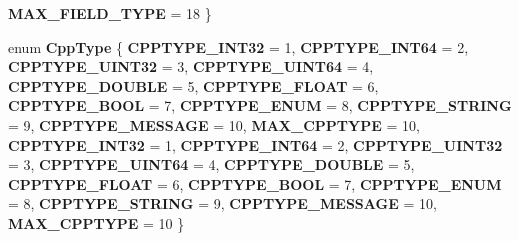 \begin{DoxyCompactItemize}
{\bfseries M\+A\+X\+\_\+\+F\+I\+E\+L\+D\+\_\+\+T\+Y\+PE} = 18
 \}
\item 
\mbox{\label{classgoogle_1_1protobuf_1_1internal_1_1WireFormatLite_a14ea06b246adcaff4062c1e54e9a761d}} 
enum {\bfseries Cpp\+Type} \{ \newline
{\bfseries C\+P\+P\+T\+Y\+P\+E\+\_\+\+I\+N\+T32} = 1, 
{\bfseries C\+P\+P\+T\+Y\+P\+E\+\_\+\+I\+N\+T64} = 2, 
{\bfseries C\+P\+P\+T\+Y\+P\+E\+\_\+\+U\+I\+N\+T32} = 3, 
{\bfseries C\+P\+P\+T\+Y\+P\+E\+\_\+\+U\+I\+N\+T64} = 4, 
\newline
{\bfseries C\+P\+P\+T\+Y\+P\+E\+\_\+\+D\+O\+U\+B\+LE} = 5, 
{\bfseries C\+P\+P\+T\+Y\+P\+E\+\_\+\+F\+L\+O\+AT} = 6, 
{\bfseries C\+P\+P\+T\+Y\+P\+E\+\_\+\+B\+O\+OL} = 7, 
{\bfseries C\+P\+P\+T\+Y\+P\+E\+\_\+\+E\+N\+UM} = 8, 
\newline
{\bfseries C\+P\+P\+T\+Y\+P\+E\+\_\+\+S\+T\+R\+I\+NG} = 9, 
{\bfseries C\+P\+P\+T\+Y\+P\+E\+\_\+\+M\+E\+S\+S\+A\+GE} = 10, 
{\bfseries M\+A\+X\+\_\+\+C\+P\+P\+T\+Y\+PE} = 10, 
{\bfseries C\+P\+P\+T\+Y\+P\+E\+\_\+\+I\+N\+T32} = 1, 
\newline
{\bfseries C\+P\+P\+T\+Y\+P\+E\+\_\+\+I\+N\+T64} = 2, 
{\bfseries C\+P\+P\+T\+Y\+P\+E\+\_\+\+U\+I\+N\+T32} = 3, 
{\bfseries C\+P\+P\+T\+Y\+P\+E\+\_\+\+U\+I\+N\+T64} = 4, 
{\bfseries C\+P\+P\+T\+Y\+P\+E\+\_\+\+D\+O\+U\+B\+LE} = 5, 
\newline
{\bfseries C\+P\+P\+T\+Y\+P\+E\+\_\+\+F\+L\+O\+AT} = 6, 
{\bfseries C\+P\+P\+T\+Y\+P\+E\+\_\+\+B\+O\+OL} = 7, 
{\bfseries C\+P\+P\+T\+Y\+P\+E\+\_\+\+E\+N\+UM} = 8, 
{\bfseries C\+P\+P\+T\+Y\+P\+E\+\_\+\+S\+T\+R\+I\+NG} = 9, 
\newline
{\bfseries C\+P\+P\+T\+Y\+P\+E\+\_\+\+M\+E\+S\+S\+A\+GE} = 10, 
{\bfseries M\+A\+X\+\_\+\+C\+P\+P\+T\+Y\+PE} = 10
 \}
\end{DoxyCompactItemize}
